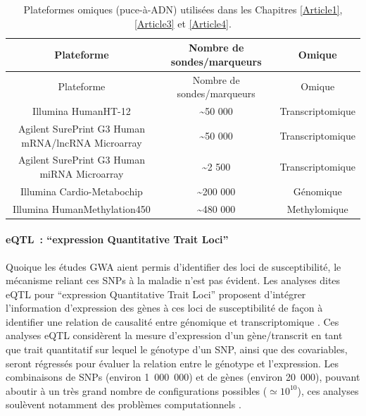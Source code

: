 \documentclass[11pt,a4paper,notrimn]{krantz}
\let\oldparagraph\paragraph
\renewcommand{\paragraph}[1]{\oldparagraph{#1}\mbox{}}
\theoremstyle{definition}
\theoremstyle{definition}
\theoremstyle{remark}
\begin{document}
\begin{longtable}[]{@{}ccc@{}}
\caption{\label{tab:omics}Plateformes omiques (puce-à-ADN) utilisées dans les
Chapitres \ref{Article1}, \ref{Article3} et \ref{Article4}.}\tabularnewline
\toprule
Plateforme & Nombre de sondes/marqueurs & Omique\tabularnewline
\midrule
\endfirsthead
\toprule
Plateforme & Nombre de sondes/marqueurs & Omique\tabularnewline
\midrule
\endhead
Illumina HumanHT-12 & \textasciitilde{}50 000 &
Transcriptomique\tabularnewline
Agilent SurePrint G3 Human mRNA/lncRNA Microarray & \textasciitilde{}50
000 & Transcriptomique\tabularnewline
Agilent SurePrint G3 Human miRNA Microarray & \textasciitilde{}2 500 &
Transcriptomique\tabularnewline
Illumina Cardio-Metabochip & \textasciitilde{}200 000 &
Génomique\tabularnewline
Illumina HumanMethylation450 & \textasciitilde{}480 000 &
Methylomique\tabularnewline
\bottomrule
\end{longtable}

\clearpage

\paragraph{\texorpdfstring{eQTL~: ``expression Quantitative Trait
Loci''}{eQTL~: expression Quantitative Trait Loci}}\label{eqtl-expression-quantitative-trait-loci}

Quoique les études GWA aient permis d'identifier des loci de
susceptibilité, le mécanisme reliant ces SNPs à la maladie n'est pas
évident. Les analyses dites eQTL pour ``expression Quantitative Trait
Loci'' \citep{rockman_genetics_2006, gibson_quantitative_2005} proposent
d'intégrer l'information d'expression des gènes à ces loci de
susceptibilité de façon à identifier une relation de causalité entre
génomique et transcriptomique
\citep{rockman_genetics_2006, gibson_quantitative_2005}. Ces analyses
eQTL considèrent la mesure d'expression d'un gène/transcrit en tant que
trait quantitatif sur lequel le génotype d'un SNP, ainsi que des
covariables, seront régressés pour évaluer la relation entre le génotype
et l'expression. Les combinaisons de SNPs (environ 1~000~000) et de
gènes (environ 20~000), pouvant aboutir à un très grand nombre de
configurations possibles (\(\simeq10^{10}\)), ces analyses soulèvent
notamment des problèmes computationnels \citep{mackay_genetics_2009}.
\end{document}
